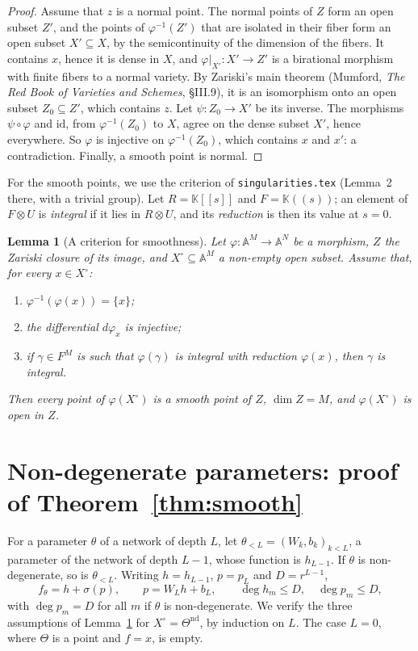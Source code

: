\documentclass[11pt]{article}
\newtheorem{lemma}{Lemma}
\theoremstyle{definition}
\theoremstyle{remark}
\newcommand{\K}{\mathbb{K}}
\newcommand{\A}{\mathbb{A}}
\newcommand{\Tn}{\Theta^{\mathrm{nd}}}
\begin{document}
\begin{proof}
Assume that $z$ is a normal point. The normal points of $Z$ form an open subset $Z'$, and the points of $\varphi^{-1}(Z')$ that are isolated in their fiber form an open subset $X'\subseteq X$, by the semicontinuity of the dimension of the fibers. It contains $x$, hence it is dense in $X$, and $\varphi|_{X'}\colon X'\to Z'$ is a birational morphism with finite fibers to a normal variety. By Zariski's main theorem (Mumford, \emph{The Red Book of Varieties and Schemes}, \S III.9), it is an isomorphism onto an open subset $Z_0\subseteq Z'$, which contains $z$. Let $\psi\colon Z_0\to X'$ be its inverse. The morphisms $\psi\circ\varphi$ and $\mathrm{id}$, from $\varphi^{-1}(Z_0)$ to $X$, agree on the dense subset $X'$, hence everywhere. So $\varphi$ is injective on $\varphi^{-1}(Z_0)$, which contains $x$ and $x'$: a contradiction. Finally, a smooth point is normal.
\end{proof}

For the smooth points, we use the criterion of \texttt{singularities.tex} (Lemma~2 there, with a trivial group). Let $R=\K[[s]]$ and $F=\K((s))$; an element of $F\otimes U$ is \emph{integral} if it lies in $R\otimes U$, and its \emph{reduction} is then its value at $s=0$.

\begin{lemma}[A criterion for smoothness]\label{lem:criterion}
Let $\varphi\colon\A^M\to\A^N$ be a morphism, $Z$ the Zariski closure of its image, and $X^\circ\subseteq\A^M$ a non-empty open subset. Assume that, for every $x\in X^\circ$:
\begin{enumerate}[label=\textup{(\alph*)},nosep]
\item $\varphi^{-1}(\varphi(x))=\{x\}$;
\item the differential $d\varphi_x$ is injective;
\item if $\gamma\in F^M$ is such that $\varphi(\gamma)$ is integral with reduction $\varphi(x)$, then $\gamma$ is integral.
\end{enumerate}
Then every point of $\varphi(X^\circ)$ is a smooth point of $Z$, $\dim Z=M$, and $\varphi(X^\circ)$ is open in $Z$.
\end{lemma}

\section{Non-degenerate parameters: proof of Theorem~\ref{thm:smooth}}

For a parameter $\theta$ of a network of depth $L$, let $\theta_{<L}=(W_k,b_k)_{k<L}$, a parameter of the network of depth $L-1$, whose function is $h_{L-1}$. If $\theta$ is non-degenerate, so is $\theta_{<L}$. Writing $h=h_{L-1}$, $p=p_L$ and $D=r^{L-1}$,
\begin{equation}\label{eq:last}
f_\theta=h+\sigma(p),\qquad p=W_Lh+b_L,\qquad\deg h_m\le D,\quad\deg p_m\le D,
\end{equation}
with $\deg p_m=D$ for all $m$ if $\theta$ is non-degenerate. We verify the three assumptions of Lemma~\ref{lem:criterion} for $X^\circ=\Tn$, by induction on $L$. The case $L=0$, where $\Theta$ is a point and $f=x$, is empty.
\end{document}
